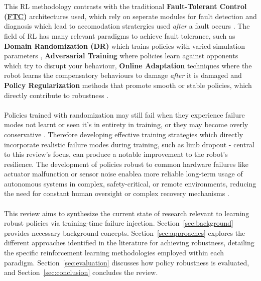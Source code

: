 \documentclass[12pt, a4paper]{article} %
\begin{document}
\\\\
    This RL methodology contrasts with the traditional \textbf{Fault-Tolerant Control (\hyperref[def:ftc]{FTC})} architectures used, which rely on seperate modules for fault detection and diagnosis which lead to accomodation stratergies used \textit{after} a fault occurs \citep{blanke1997, ahmed2020fault}.
The field of RL has many relevant paradigms to achieve fault tolerance, such as \textbf{Domain Randomization (DR)} which trains policies with varied simulation parameters \citep[]{liu2023saving, rajeswaran2016epopt}, \textbf{Adversarial Training} where policies learn against opponents which try to disrupt your behaviour, \textbf{Online Adaptation} techniques where the robot learns the compensatory behaviours to damage \textit{after} it is damaged \citep{cully2015robots, chatzilygeroudis2018reset, pham2024adaptive} and \textbf{Policy Regularization} methods that promote smooth or stable policies, which directly contribute to robustness \citep[e.g.,][]{shen2020deep}.\\\\
\noindent
Policies trained with randomization may still fail when they experience failure modes not learnt or seen it's in entirety in training, or they may become overly conservative \citep[]{rajeswaran2016epopt}.
Therefore developing effective training strategies which directly incorporate realistic failure modes during training, such as limb dropout - central to this review's focus, can produce a notable improvement to the robot's resilience.
The development of policies robust to common hardware failures like actuator malfunction or sensor noise enablea more reliable long-term usage of autonomous systems in complex, safety-critical, or remote environments, reducing the need for constant human oversight or complex recovery mechanisms \citep{cully2015robots, liu2023saving}.\\\\
\noindent
This review aims to synthesize the current state of research relevant to learning robust policies via training-time failure injection.
Section~\ref{sec:background} provides necessary background concepts.
Section~\ref{sec:approaches} explores the different approaches identified in the literature for achieving robustness, detailing the specific reinforcement learning methodologies employed within each paradigm.
Section~\ref{sec:evaluation} discusses how policy robustness is evaluated, and Section~\ref{sec:conclusion} concludes the review.
\end{document}
